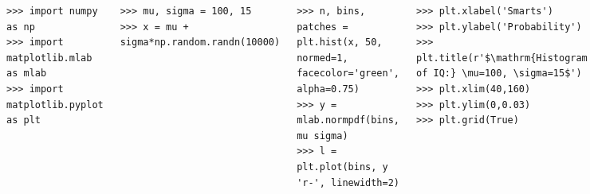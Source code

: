 \documentclass[x11names,svgnames,11pt]{beamer}
\begin{document}
\begin{frame}
\begin{columns}
			\begin{tcolorbox}[title={\small 1} Import libraries]
				\begin{lstlisting}[numbers=none]
>>> import numpy as np
>>> import matplotlib.mlab as mlab
>>> import matplotlib.pyplot as plt
				\end{lstlisting} 
			\end{tcolorbox}
			
			\begin{tcolorbox}[title={\small 2} Prepare data]
				\begin{lstlisting}[numbers=none]
>>> mu, sigma = 100, 15
>>> x = mu + sigma*np.random.randn(10000)
				\end{lstlisting} 
			\end{tcolorbox}	
		
			\begin{tcolorbox}[title={\small 3} Create plot]
				\begin{lstlisting}[numbers=none]
>>> n, bins, patches = plt.hist(x, 50, normed=1, facecolor='green', alpha=0.75)
>>> y = mlab.normpdf(bins, mu sigma)
>>> l = plt.plot(bins, y 'r-', linewidth=2)
				\end{lstlisting} 
			\end{tcolorbox}
			
			\begin{tcolorbox}[title={\small 4} Customize plot]
				\begin{lstlisting}[numbers=none]
>>> plt.xlabel('Smarts')
>>> plt.ylabel('Probability')
>>> plt.title(r'$\mathrm{Histogram of IQ:} \mu=100, \sigma=15$')
>>> plt.xlim(40,160)
>>> plt.ylim(0,0.03)
>>> plt.grid(True)
				\end{lstlisting} 
			\end{tcolorbox}

			\begin{tcolorbox}[title={\small 5} Show / Save plot]
				\begin{lstlisting}[numbers=none]
>>> plt.savefi('histogram.png')
>>> plt.show()
				\end{lstlisting}
			\end{tcolorbox}
	\end{columns}
\end{frame}
\end{document}
